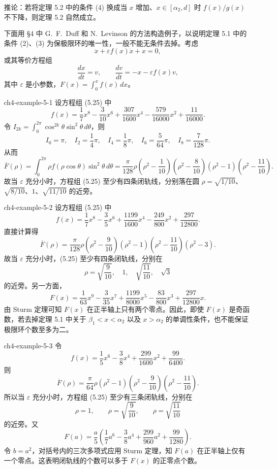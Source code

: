 推论：若将定理 5.2 中的条件 (4) 换成当 $x$ 增加、$x\in[\alpha_2,d]$ 时 $f(x)/g(x)$ 不下降，则定理 5.2 自然成立。

下面用 \S4 中 G.~F.~Duff 和 N.~Levinson 的方法构造例子，以说明定理 5.1 中的条件 (2)、(3) 为保极限环的唯一性，一般不能无条件去掉。考虑
\begin{equation}
\ddot{x}+\varepsilon f(x)\dot{x}+x=0,\tag{5.24}
\end{equation}
或其等价方程组
\begin{equation}
\dfrac{dx}{dt}=v,\qquad \dfrac{dv}{dt}=-x-\varepsilon f(x)v,\tag{5.25}
\end{equation}
其中 $\varepsilon$ 是小参数，$F(x)=\int_0^xf(x)\,dx$。

\begin{example}{ }{ch4-example-5-1}
设方程组 (5.25) 中
\[
f(x)=\dfrac17x^8-\dfrac3{10}x^6+\dfrac{307}{1600}x^4-\dfrac{579}{16000}x^2+\dfrac{11}{16000}.
\]
令 $I_{2k}=\int_0^{2\pi}\cos^{2k}\theta\sin^2\theta\,d\theta$，则
\[
I_0=\pi,\quad I_2=\dfrac14\pi,\quad I_4=\dfrac18\pi,\quad I_6=\dfrac5{64}\pi,\quad I_8=\dfrac7{128}\pi.
\]
从而
\[
\overline F(\rho)=\int_0^{2\pi}\rho f(\rho\cos\theta)\sin^2\theta\,d\theta
=\dfrac\pi{128}\rho\left(\rho^2-\dfrac1{10}\right)\left(\rho^2-\dfrac8{10}\right)(\rho^2-1)\left(\rho^2-\dfrac{11}{10}\right).
\]
故当 $\varepsilon$ 充分小时，方程组 (5.25) 至少有四条闭轨线，分别落在圆 $\rho=\sqrt{1/10}$、$\sqrt{8/10}$、$1$、$\sqrt{11/10}$ 的近旁。
\end{example}


\begin{example}{ }{ch4-example-5-2}
设方程组 (5.25) 中
\[
f(x)=\dfrac17x^8-\dfrac35x^6+\dfrac{1199}{1600}x^4-\dfrac{249}{800}x^2+\dfrac{297}{12800}.
\]
直接计算得
\[
\overline F(\rho)=\dfrac\pi{128}\rho
\left(\rho^2-\dfrac9{10}\right)(\rho^2-1)
\left(\rho^2-\dfrac{11}{10}\right)(\rho^2-3).
\]
故当 $\varepsilon$ 充分小时，(5.25) 至少有四条闭轨线，分别在
\[
\rho=\sqrt{\dfrac9{10}},\quad 1,\quad
\sqrt{\dfrac{11}{10}},\quad\sqrt3
\]
的近旁。另一方面，
\[
F(x)=\dfrac1{63}x^9-\dfrac3{35}x^7+\dfrac{1199}{8000}x^5
-\dfrac{83}{800}x^3+\dfrac{297}{12800}x.
\]
由 Sturm 定理可知 $F(x)$ 在正半轴上只有两个零点。因此，即使 $F(x)$ 是奇函数，若去掉定理 5.1 中关于 $\beta_1<x<\alpha_2$ 以及 $x>\alpha_2$ 的单调性条件，也不能保证极限环个数至多为二。
\end{example}


\begin{example}{ }{ch4-example-5-3}
令
\[
f(x)=\dfrac15x^6-\dfrac38x^4+\dfrac{299}{1600}x^2+\dfrac{99}{6400}.
\]
则
\[
\overline F(\rho)=\dfrac\pi{64}\rho(\rho^2-1)
\left(\rho^2-\dfrac9{10}\right)
\left(\rho^2-\dfrac{11}{10}\right).
\]
所以当 $\varepsilon$ 充分小时，方程组 (5.25) 至少有三条闭轨线，分别在
\[
\rho=1,\qquad\rho=\sqrt{\dfrac9{10}},\qquad
\rho=\sqrt{\dfrac{11}{10}}
\]
的近旁。又
\[
F(a)=\dfrac a5\left(\dfrac17a^6-\dfrac38a^4+
\dfrac{299}{960}a^2+\dfrac{99}{1280}\right).
\]
令 $b=a^2$，对括号内的三次多项式应用 Sturm 定理，知 $F(a)$ 在正半轴上仅有一个零点。这表明闭轨线的个数可以多于 $F(x)$ 的正零点个数。
\end{example}

